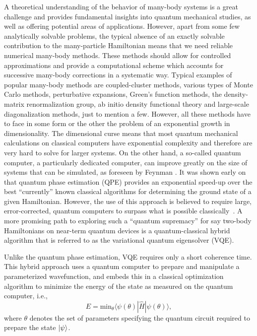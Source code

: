 \documentclass[10pt]{article}
\begin{document}
A theoretical understanding of the behavior of many-body systems
is a  great challenge and provides fundamental insights into quantum 
mechanical studies, as well
as offering potential areas of applications.
However, apart from some few analytically solvable problems,
the typical absence of an exactly solvable contribution to the
many-particle
 Hamiltonian
means that we need reliable numerical many-body methods.
These methods should allow for controlled approximations
and provide a computational scheme which accounts for successive
many-body corrections in a systematic way.
Typical examples of
popular many-body methods are coupled-cluster methods,
various types of
Monte Carlo methods, perturbative expansions, Green's function methods, the density-matrix renormalization group,
ab initio density functional theory
and large-scale diagonalization methods, just to mention a few.
However, all these methods have to face in some form or the other the problem of 
an exponential growth in dimensionality.  The dimensional curse means that most quantum
mechanical calculations on classical computers have exponential
complexity and therefore are very hard to solve for larger systems. On 
the other hand, a so-called 
quantum computer, a particularly dedicated computer,
can improve greatly on the size of systems that can be simulated, as
foreseen by Feynman \cite{feynman1982,feynman1986}.  It was shown early on that quantum phase estimation (QPE) provides an
exponential speed-up over the best ``currently'' known classical algorithms for determining
the ground state of a given Hamiltonian.\cite{aspuru2005simulated} However, the use
of this approach is believed to require large, error-corrected, quantum
computers to surpass what is possible classically~\cite{reiher2017elucidating,babbush2018encoding}.
A more promising path to exploring such a ``quantum supremacy''\cite{boixo2018characterizing,harrow2017quantum} for say two-body Hamiltonians on near-term quantum
devices is a quantum-classical hybrid algorithm that is referred to as the variational quantum
eigensolver (VQE)\cite{peruzzo2014variational,McArdle2018}.

Unlike the quantum phase estimation, VQE requires only a short coherence time.
This hybrid approach uses a quantum computer to prepare and
manipulate a parameterized wavefunction, and {embeds this in} a classical optimization
algorithm to minimize the energy of the state as measured on the quantum computer, i.e., 
\begin{equation}
E = \text{min}_{\theta} \langle\psi(\theta)|\hat{H}|\psi(\theta)\rangle,
\label{eq:vqe}
\end{equation}
where $\theta$ denotes the set of parameters specifying the quantum circuit required to prepare the state $\ket{\psi}$.
\end{document}
